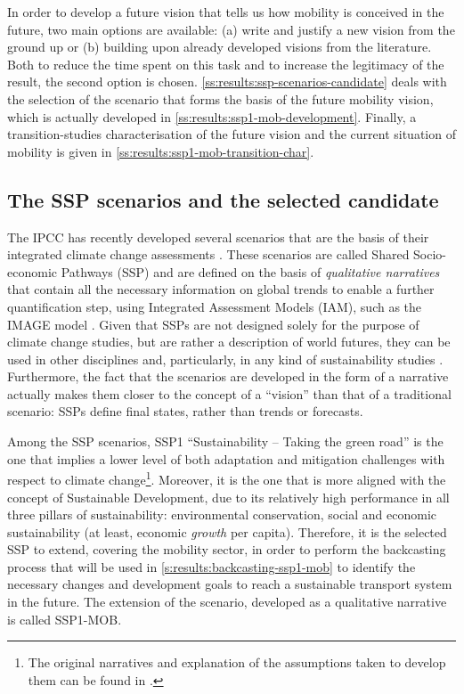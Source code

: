 In order to develop a future vision that tells us how mobility is conceived in the future, two main options are available: (a) write and justify a new vision from the ground up or (b) building upon already developed visions from the literature. Both to reduce the time spent on this task and to increase the legitimacy of the result, the second option is chosen. \autoref{ss:results:ssp-scenarios-candidate} deals with the selection of the scenario that forms the basis of the future mobility vision, which is actually developed in \autoref{ss:results:ssp1-mob-development}. Finally, a transition-studies characterisation of the future vision and the current situation of mobility is given in \autoref{ss:results:ssp1-mob-transition-char}.

\subsection{The SSP scenarios and the selected candidate}
\label{ss:results:ssp-scenarios-candidate}
The IPCC has recently developed several scenarios that are the basis of their integrated climate change assessments \parencite{oneill2017_roadsaheadNarratives,vuuren2017_Energylanduse,fricko2017_markerquantificationShared,fujimori2017_SSP3AIMimplementation,calvin2017_SSP4worlddeepening,kriegler2017_Fossilfueleddevelopment}. These scenarios are called Shared Socio-economic Pathways (SSP) and are defined on the basis of \textit{qualitative narratives} that contain all the necessary information on global trends to enable a further quantification step, using Integrated Assessment Models (IAM), such as the IMAGE model \parencite{vuuren2017_Energylanduse}. Given that SSPs are not designed solely for the purpose of climate change studies, but are rather a description of world futures, they can be used in other disciplines and, particularly, in any kind of sustainability studies \parencite{oneill2017_roadsaheadNarratives}. Furthermore, the fact that the scenarios are developed in the form of a narrative actually makes them closer to the concept of a ``vision'' than that of a traditional scenario: SSPs define final states, rather than trends or forecasts.

Among the SSP scenarios, SSP1 ``Sustainability -- Taking the green road'' is the one that implies a lower level of both adaptation and mitigation challenges with respect to climate change\footnote{The original narratives and explanation of the assumptions taken to develop them can be found in \textcite{oneill2017_roadsaheadNarratives}.}. Moreover, it is the one that is more aligned with the concept of Sustainable Development, due to its relatively high performance in all three pillars of sustainability: environmental conservation, social and economic sustainability (at least, economic \textit{growth} per capita). Therefore, it is the selected SSP to extend, covering the mobility sector, in order to perform the backcasting process that will be used in \autoref{s:results:backcasting-ssp1-mob} to identify the necessary changes and development goals to reach a sustainable transport system in the future. The extension of the scenario, developed as a qualitative narrative is called SSP1-MOB.

